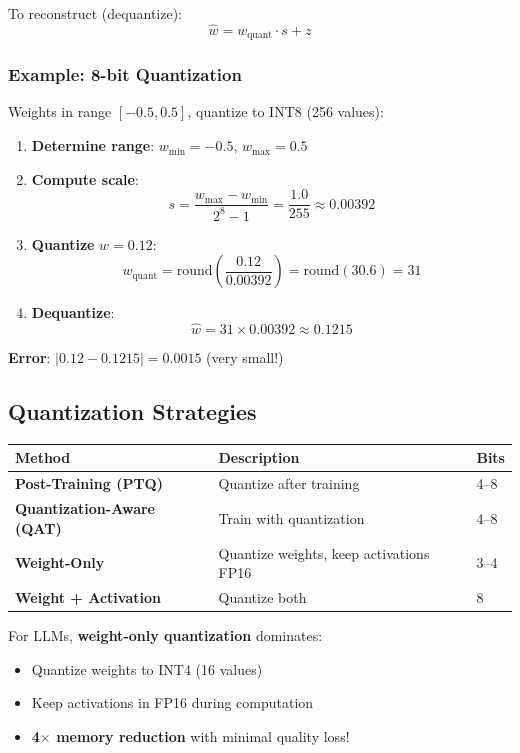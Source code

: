 \documentclass{article}
\begin{document}
To reconstruct (dequantize):
\[
\hat{w} = w_{\text{quant}} \cdot s + z
\]

\subsubsection{Example: 8-bit Quantization}

Weights in range $[-0.5, 0.5]$, quantize to INT8 (256 values):

\begin{enumerate}
\item \textbf{Determine range}: $w_{\min} = -0.5$, $w_{\max} = 0.5$
\item \textbf{Compute scale}:
\[
s = \frac{w_{\max} - w_{\min}}{2^8 - 1} = \frac{1.0}{255} \approx 0.00392
\]
\item \textbf{Quantize} $w = 0.12$:
\[
w_{\text{quant}} = \text{round}\left(\frac{0.12}{0.00392}\right) = \text{round}(30.6) = 31
\]
\item \textbf{Dequantize}:
\[
\hat{w} = 31 \times 0.00392 \approx 0.1215
\]
\end{enumerate}

\textbf{Error}: $|0.12 - 0.1215| = 0.0015$ (very small!)

\subsection{Quantization Strategies}

\begin{center}
\begin{tabular}{lp{5cm}l}
\toprule
\textbf{Method} & \textbf{Description} & \textbf{Bits} \\
\midrule
\textbf{Post-Training (PTQ)} & Quantize after training & 4--8 \\
\textbf{Quantization-Aware (QAT)} & Train with quantization & 4--8 \\
\textbf{Weight-Only} & Quantize weights, keep activations FP16 & 3--4 \\
\textbf{Weight + Activation} & Quantize both & 8 \\
\bottomrule
\end{tabular}
\end{center}

For LLMs, \textbf{weight-only quantization} dominates:
\begin{itemize}
\item Quantize weights to INT4 (16 values)
\item Keep activations in FP16 during computation
\item \textbf{4$\times$ memory reduction} with minimal quality loss!
\end{itemize}
\end{document}
